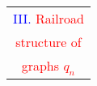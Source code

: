 \documentclass[%
pdf,
colorBG,
slideColor,
]{prosper}
\begin{document}
%





\begin{slide}{}
\begin{center}
{\Huge 
\begin{tabular*}{6cm}{c}
\\[-0.5cm]
\textcolor{blue}{III. }\textcolor{red}{Railroad}\\
\textcolor{red}{structure of}\\
\textcolor{red}{graphs $q_n$}
\end{tabular*}
}
\end{center}
\end{slide}
\end{document}
